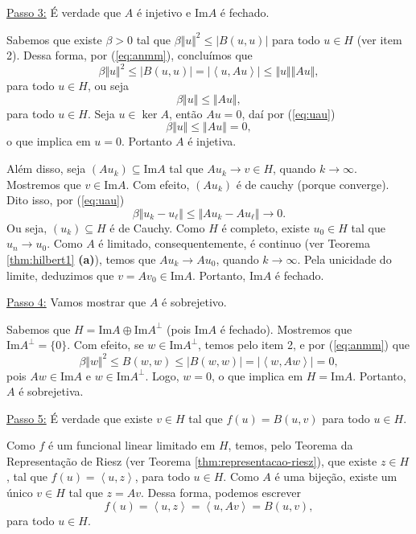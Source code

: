 \documentclass[a4paper, 11pt]{book}
\theoremstyle{definition}
\begin{document}
\begin{prf}
    \underline{Passo 3:} É verdade que $A$ é injetivo e $\mathrm{Im}A$ é fechado.

    Sabemos que existe $\beta > 0$ tal que $\beta \Vert u \Vert^2 \leqslant |B(u,u)|$ para todo $u \in H$ (ver item 2). Dessa forma, por (\ref{eq:anmm}), concluímos que
    \[
        \beta \Vert u \Vert^2 \leqslant |B(u,u)| = | \left\langle u, Au \right\rangle | \leqslant \Vert u \Vert \Vert Au \Vert,
    \]
    para todo $u \in H$, ou seja
    \begin{equation} \label{eq:uau}
        \beta \Vert u \Vert \leqslant \Vert Au \Vert,
    \end{equation}
    para todo $u \in H$.
    Seja $u \in \ker A$, então $Au = 0$, daí por (\ref{eq:uau})
    \[
        \beta \Vert u \Vert \leqslant \Vert Au \Vert = 0,
    \]
    o que implica em $u = 0$.
    Portanto $A$ é injetiva.

    Além disso, seja $(Au_k) \subseteq \mathrm{Im} A$ tal que $A u_k \to v \in H$, quando $k \to \infty$.
    Mostremos que $v \in \mathrm{Im}A$.
    Com efeito, $(Au_k)$ é de cauchy (porque converge). Dito isso, por (\ref{eq:uau})
    \[
        \beta \Vert u_k - u_\ell \Vert \leqslant \Vert Au_k - Au_\ell \Vert \to 0.
    \]
    Ou seja, $(u_k) \subseteq H$ é de Cauchy.
    Como $H$ é completo, existe $u_0 \in H$ tal que $u_n \to u_0$. Como $A$ é limitado, consequentemente, é continuo (ver Teorema \ref{thm:hilbert1} \textbf{(a)}), temos que $Au_k \to Au_0$, quando $k \to \infty$.
    Pela unicidade do limite, deduzimos que $v = Av_0 \in \mathrm{Im}A$.
    Portanto, $\mathrm{Im}A$ é fechado.

    \underline{Passo 4:} Vamos mostrar que $A$ é sobrejetivo.

    Sabemos que $H = \mathrm{Im}A \oplus \mathrm{Im}A^\perp$ (pois $\mathrm{Im}A$ é fechado). Mostremos que $\mathrm{Im}A^\perp = \{0\}$.
    Com efeito, se $w \in \mathrm{Im}A^\perp$, temos pelo item 2, e por (\ref{eq:anmm}) que
    \[
        \beta \Vert w \Vert^2 \leqslant B(w,w) \leqslant | B(w,w) | = | \left\langle w, Aw \right\rangle | = 0,
    \]
    pois $Aw \in \mathrm{Im}A$ e $w \in \mathrm{Im}A^\perp$.
    Logo, $w = 0$, o que implica em $H = \mathrm{Im}A$.
    Portanto, $A$ é sobrejetiva.

    \underline{Passo 5:} É verdade que existe $v \in H$ tal que $f(u) = B(u,v)$ para todo $u \in H$.

    Como $f$ é um funcional linear limitado em $H$, temos, pelo Teorema da Representação de Riesz (ver Teorema \ref{thm:representacao-riesz}), que existe $z \in H$, tal que $f(u) = \left\langle u, z \right\rangle$, para todo $u \in H$.
    Como $A$ é uma bijeção, existe um único $v \in H$ tal que $z = Av$. Dessa forma, podemos escrever
    \begin{equation} \label{eq:annn}
        f(u) = \left\langle u,z \right\rangle = \left\langle u, Av \right\rangle = B(u,v),
    \end{equation}
    para todo $u \in H$.


\end{prf}
\end{document}
